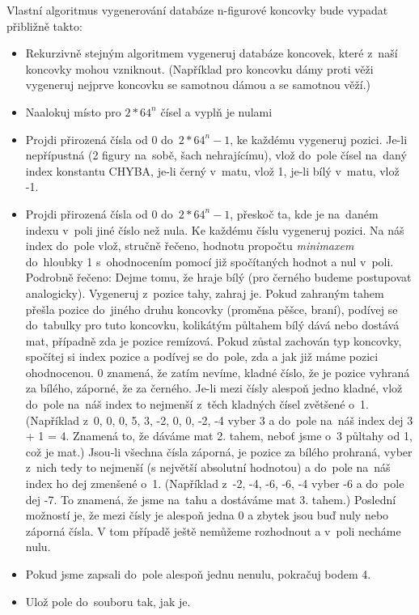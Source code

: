 \documentclass[11pt, titlepage]{article}
\begin{document}
Vlastní algoritmus vygenerování databáze n-figurové koncovky bude vypadat přibližně takto:
\begin{itemize}
	\item Rekurzivně stejným algoritmem vygeneruj databáze koncovek, které z~naší koncovky mohou vzniknout. (Například pro koncovku dámy proti věži vygeneruj nejprve koncovku se samotnou dámou a se samotnou věží.)
	\item Naalokuj místo pro \begin{math}2 * 64^n\end{math} čísel a vyplň je nulami
	\item Projdi přirozená čísla od 0 do~\begin{math}2 * 64^n -1\end{math}, ke každému vygeneruj pozici. Je-li nepřípustná (2 figury na~sobě, šach nehrajícímu), vlož do~pole čísel na~daný index konstantu CHYBA, je-li černý v~matu, vlož 1, je-li bílý v~matu, vlož -1.
	\item Projdi přirozená čísla od 0 do~\begin{math}2 * 64^n -1\end{math}, přeskoč ta, kde je na~daném indexu v~poli jiné číslo než nula. Ke každému číslu vygeneruj pozici. Na náš index do~pole vlož, stručně řečeno, hodnotu propočtu {\it minimaxem} do~hloubky 1 s~ohodnocením pomocí již spočítaných hodnot a nul v~poli. Podrobně řečeno: Dejme tomu, že hraje bílý (pro černého budeme postupovat analogicky). Vygeneruj z~pozice tahy, zahraj je. Pokud zahraným tahem přešla pozice do~jiného druhu koncovky (proměna pěšce, braní), podívej se do~tabulky pro tuto koncovku, kolikátým půltahem bílý dává nebo dostává mat, případně zda je pozice remízová. Pokud zůstal zachován typ koncovky, spočítej si index pozice a podívej se do~pole, zda a jak již máme pozici ohodnocenou. 0 znamená, že zatím nevíme, kladné číslo, že je pozice vyhraná za bílého, záporné, že za černého. Je-li mezi čísly alespoň jedno kladné, vlož do~pole na~náš index to nejmenší z~těch kladných čísel zvětšené o~1. (Například z~0, 0, 0, 5, 3, -2, 0, 0, -2, -4 vyber 3 a do~pole na~náš index dej 3 + 1 = 4. Znamená to, že dáváme mat 2. tahem, neboť jsme o~3 půltahy od 1, což je mat.) Jsou-li všechna čísla záporná, je pozice za bílého prohraná, vyber z~nich tedy to nejmenší (s největší absolutní hodnotou) a do~pole na~náš index ho dej zmenšené o~1. (Například z~-2, -4, -6, -6, -4 vyber -6 a do~pole dej -7. To znamená, že jsme na~tahu a dostáváme mat 3. tahem.) Poslední možností je, že mezi čísly je alespoň jedna 0 a zbytek jsou buď nuly nebo záporná čísla. V tom případě ještě nemůžeme rozhodnout a v~poli necháme nulu.
	\item Pokud jsme zapsali do~pole alespoň jednu nenulu, pokračuj bodem 4.
	\item Ulož pole do~souboru tak, jak je.
\end{itemize}
\end{document}

